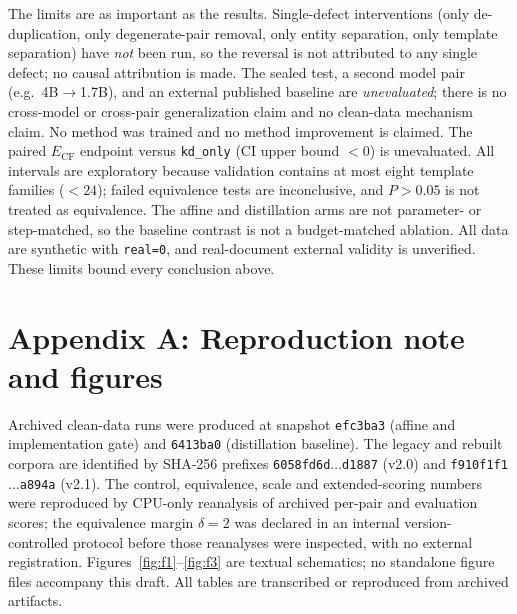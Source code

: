 \documentclass[11pt,a4paper]{article}
\begin{document}
The limits are as important as the results. Single-defect interventions (only
de-duplication, only degenerate-pair removal, only entity separation, only
template separation) have \emph{not} been run, so the reversal is not
attributed to any single defect; no causal attribution is made. The sealed
test, a second model pair (e.g.\ 4B$\to$1.7B), and an external published
baseline are \emph{unevaluated}; there is no cross-model or cross-pair
generalization claim and no clean-data mechanism claim. No method was trained
and no method improvement is claimed. The paired $E_{\mathrm{CF}}$ endpoint
versus \texttt{kd\_only} (CI upper bound $<0$) is unevaluated. All intervals are
exploratory because validation contains at most eight template families
($<24$); failed equivalence tests are inconclusive, and $P>0.05$ is not treated
as equivalence. The affine and distillation arms are not parameter- or
step-matched, so the baseline contrast is not a budget-matched ablation. All
data are synthetic with \texttt{real=0}, and real-document external validity is
unverified. These limits bound every conclusion above.

\section*{Appendix A: Reproduction note and figures}

Archived clean-data runs were produced at snapshot \texttt{efc3ba3} (affine and
implementation gate) and \texttt{6413ba0} (distillation baseline). The legacy
and rebuilt corpora are identified by SHA-256 prefixes \texttt{6058fd6d$\ldots$d1887}
(v2.0) and \texttt{f910f1f1$\ldots$a894a} (v2.1). The control, equivalence,
scale and extended-scoring numbers were reproduced by CPU-only reanalysis of
archived per-pair and evaluation scores; the equivalence margin $\delta=2$ was
declared in an internal version-controlled protocol before those reanalyses
were inspected, with no external registration. Figures~\ref{fig:f1}--\ref{fig:f3}
are textual schematics; no standalone figure files accompany this draft. All
tables are transcribed or reproduced from archived artifacts.
\end{document}
